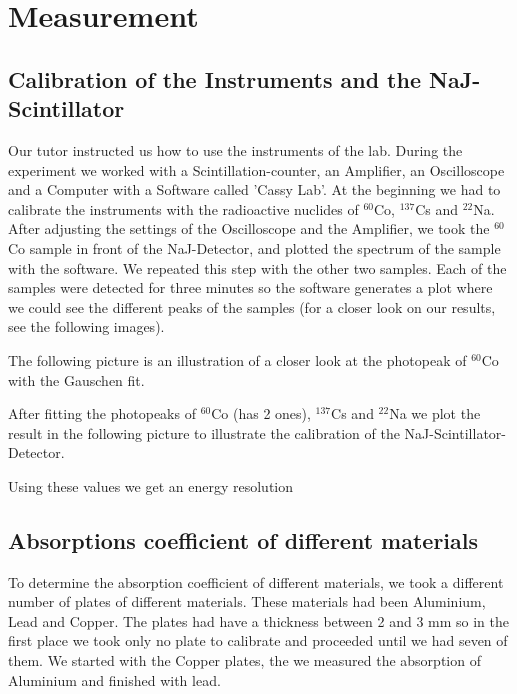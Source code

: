 \section{Measurement}

\subsection{Calibration of the Instruments and the NaJ-Scintillator}
Our tutor instructed us how to use the instruments of the lab. During the experiment we worked with a Scintillation-counter, an Amplifier, an Oscilloscope and a Computer with a Software called 'Cassy Lab'. At the beginning we had to calibrate the instruments with the radioactive nuclides of $^{60}$Co, $^{137}$Cs and $^{22}$Na. After adjusting the settings of the Oscilloscope and the Amplifier, we took the $^{60}$Co sample in front of the NaJ-Detector, and plotted the spectrum of the sample with the software. We repeated this step with the other two samples. Each of the samples were detected for three minutes so the software generates a plot where we could see the different peaks of the samples (for a closer look on our results, see the following images).


The following picture is an illustration of a closer look at the photopeak of $^{60}$Co with the Gauschen fit.


After fitting the photopeaks of $^{60}$Co (has 2 ones), $^{137}$Cs and $^{22}$Na we plot the result in the following picture to illustrate the calibration of the NaJ-Scintillator-Detector.

Using these values we get an energy resolution

\subsection{Absorptions coefficient of different materials}
To determine the absorption coefficient of different materials, we took a different number of plates of different materials. These materials had been Aluminium, Lead and Copper. The plates had have a thickness between 2 and 3 mm so in the first place we took only no plate to calibrate and proceeded until we had seven of them. We started with the Copper plates, the we measured the absorption of Aluminium and finished with lead.

